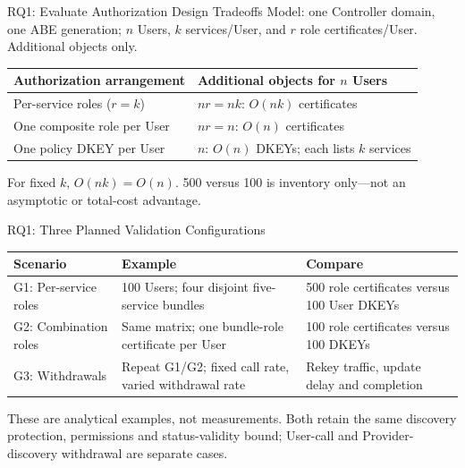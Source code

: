 \begin{frame}{RQ1: Evaluate Authorization Design Tradeoffs}
\small
Model: one Controller domain, one ABE generation; $n$ Users, $k$ services/User,
and $r$ role certificates/User. Additional objects only.
\par\vspace{3mm}
\begin{tabularx}{\linewidth}{p{.53\linewidth}X}
\toprule Authorization arrangement & Additional objects for $n$ Users\\\midrule
Per-service roles ($r=k$) & $nr=nk$: $O(nk)$ certificates\\\midrule
One composite role per User & $nr=n$: $O(n)$ certificates\\\midrule
One policy DKEY per User & $n$: $O(n)$ DKEYs; each lists $k$ services\\\bottomrule
\end{tabularx}
\par\vspace{2mm}For fixed $k$, $O(nk)=O(n)$. 500 versus 100 is inventory only—not an asymptotic or total-cost advantage.
\par\vspace{3mm}
\end{frame}

\begin{frame}{RQ1: Three Planned Validation Configurations}
\small
\begin{tabularx}{\linewidth}{p{.25\linewidth}p{.36\linewidth}X}
\toprule Scenario & Example & Compare\\\midrule
G1: Per-service roles & 100 Users; four disjoint five-service bundles & 500 role certificates versus 100 User DKEYs\\\midrule
G2: Combination roles & Same matrix; one bundle-role certificate per User & 100 role certificates versus 100 DKEYs\\\midrule
G3: Withdrawals & Repeat G1/G2; fixed call rate, varied withdrawal rate & Rekey traffic, update delay and completion\\\bottomrule
\end{tabularx}
\par\vspace{2mm}These are analytical examples, not measurements. Both retain the same discovery protection, permissions and status-validity bound; User-call and Provider-discovery withdrawal are separate cases.
\par\vspace{3mm}
\end{frame}

